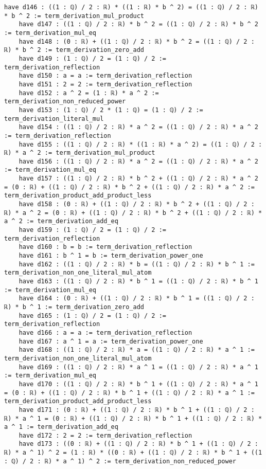 \documentclass{article}
\begin{document}
\begin{tcolorbox}[colback=white!10, width=\linewidth]
\begin{lstlisting}[language=Lean4]
    have d146 : ((1 : ℚ) / 2 : ℝ) * ((1 : ℝ) * b ^ 2) = ((1 : ℚ) / 2 : ℝ) * b ^ 2 := term_derivation_mul_product
    have d147 : ((1 : ℚ) / 2 : ℝ) * b ^ 2 = ((1 : ℚ) / 2 : ℝ) * b ^ 2 := term_derivation_mul_eq
    have d148 : (0 : ℝ) + ((1 : ℚ) / 2 : ℝ) * b ^ 2 = ((1 : ℚ) / 2 : ℝ) * b ^ 2 := term_derivation_zero_add
    have d149 : (1 : ℚ) / 2 = (1 : ℚ) / 2 := term_derivation_reflection
    have d150 : a = a := term_derivation_reflection
    have d151 : 2 = 2 := term_derivation_reflection
    have d152 : a ^ 2 = (1 : ℝ) * a ^ 2 := term_derivation_non_reduced_power
    have d153 : (1 : ℚ) / 2 * (1 : ℚ) = (1 : ℚ) / 2 := term_derivation_literal_mul
    have d154 : ((1 : ℚ) / 2 : ℝ) * a ^ 2 = ((1 : ℚ) / 2 : ℝ) * a ^ 2 := term_derivation_reflection
    have d155 : ((1 : ℚ) / 2 : ℝ) * ((1 : ℝ) * a ^ 2) = ((1 : ℚ) / 2 : ℝ) * a ^ 2 := term_derivation_mul_product
    have d156 : ((1 : ℚ) / 2 : ℝ) * a ^ 2 = ((1 : ℚ) / 2 : ℝ) * a ^ 2 := term_derivation_mul_eq
    have d157 : ((1 : ℚ) / 2 : ℝ) * b ^ 2 + ((1 : ℚ) / 2 : ℝ) * a ^ 2 = (0 : ℝ) + ((1 : ℚ) / 2 : ℝ) * b ^ 2 + ((1 : ℚ) / 2 : ℝ) * a ^ 2 := term_derivation_product_add_product_less
    have d158 : (0 : ℝ) + ((1 : ℚ) / 2 : ℝ) * b ^ 2 + ((1 : ℚ) / 2 : ℝ) * a ^ 2 = (0 : ℝ) + ((1 : ℚ) / 2 : ℝ) * b ^ 2 + ((1 : ℚ) / 2 : ℝ) * a ^ 2 := term_derivation_add_eq
    have d159 : (1 : ℚ) / 2 = (1 : ℚ) / 2 := term_derivation_reflection
    have d160 : b = b := term_derivation_reflection
    have d161 : b ^ 1 = b := term_derivation_power_one
    have d162 : ((1 : ℚ) / 2 : ℝ) * b = ((1 : ℚ) / 2 : ℝ) * b ^ 1 := term_derivation_non_one_literal_mul_atom
    have d163 : ((1 : ℚ) / 2 : ℝ) * b ^ 1 = ((1 : ℚ) / 2 : ℝ) * b ^ 1 := term_derivation_mul_eq
    have d164 : (0 : ℝ) + ((1 : ℚ) / 2 : ℝ) * b ^ 1 = ((1 : ℚ) / 2 : ℝ) * b ^ 1 := term_derivation_zero_add
    have d165 : (1 : ℚ) / 2 = (1 : ℚ) / 2 := term_derivation_reflection
    have d166 : a = a := term_derivation_reflection
    have d167 : a ^ 1 = a := term_derivation_power_one
    have d168 : ((1 : ℚ) / 2 : ℝ) * a = ((1 : ℚ) / 2 : ℝ) * a ^ 1 := term_derivation_non_one_literal_mul_atom
    have d169 : ((1 : ℚ) / 2 : ℝ) * a ^ 1 = ((1 : ℚ) / 2 : ℝ) * a ^ 1 := term_derivation_mul_eq
    have d170 : ((1 : ℚ) / 2 : ℝ) * b ^ 1 + ((1 : ℚ) / 2 : ℝ) * a ^ 1 = (0 : ℝ) + ((1 : ℚ) / 2 : ℝ) * b ^ 1 + ((1 : ℚ) / 2 : ℝ) * a ^ 1 := term_derivation_product_add_product_less
    have d171 : (0 : ℝ) + ((1 : ℚ) / 2 : ℝ) * b ^ 1 + ((1 : ℚ) / 2 : ℝ) * a ^ 1 = (0 : ℝ) + ((1 : ℚ) / 2 : ℝ) * b ^ 1 + ((1 : ℚ) / 2 : ℝ) * a ^ 1 := term_derivation_add_eq
    have d172 : 2 = 2 := term_derivation_reflection
    have d173 : ((0 : ℝ) + ((1 : ℚ) / 2 : ℝ) * b ^ 1 + ((1 : ℚ) / 2 : ℝ) * a ^ 1) ^ 2 = (1 : ℝ) * ((0 : ℝ) + ((1 : ℚ) / 2 : ℝ) * b ^ 1 + ((1 : ℚ) / 2 : ℝ) * a ^ 1) ^ 2 := term_derivation_non_reduced_power

\end{lstlisting}
\end{tcolorbox}
\end{document}
